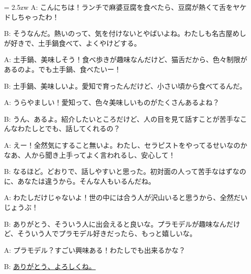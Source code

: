 \documentclass[11pt]{amsart}
\title{}
\author{}
\newenvironment{hangall}[1]{\hangindent = 2.5zw\everypar{\hangindent = 2.5zw}}{}
\begin{document}
\maketitle
\begin{hangall}{}%
A: こんにちは！ランチで麻婆豆腐を食べたら、豆腐が熱くて舌をヤケドしちゃったわ！

B: そうなんだ。熱いのって、気を付けないとやばいよね。わたしも名古屋めしが好きで、土手鍋食べて、よくやけどする。

A: 土手鍋、美味しそう！食べ歩きが趣味なんだけど、猫舌だから、色々制限があるのよ。でも土手鍋、食べたいー！

B: 土手鍋、美味しいよ。愛知で育ったんだけど、小さい頃から食べてるんだ。

A: うらやましい！愛知って、色々美味しいものがたくさんあるよね？

B: うん、あるよ。紹介したいところだけど、人の目を見て話すことが苦手なこんなわたしとでも、話してくれるの？

A: えー！全然気にすること無いよ。わたし、セラピストをやってるせいなのかなあ、人から聞き上手ってよく言われるし、安心して！

B: なるほど。どおりで、話しやすいと思った。初対面の人って苦手なはずなのに、あなたは違うから。そんな人もいるんだね。

A: わたしだけじゃないよ！世の中には合う人が沢山いると思うから、全然だいじょうぶ！

B: ありがとう、そういう人に出会えると良いな。プラモデルが趣味なんだけど、そういう人でプラモデル好きだったら、もっと嬉しいな。

A: プラモデル？すごい興味ある！わたしでも出来るかな？

B: \ul{ありがとう、よろしくね。}\end{hangall}
\end{document}
